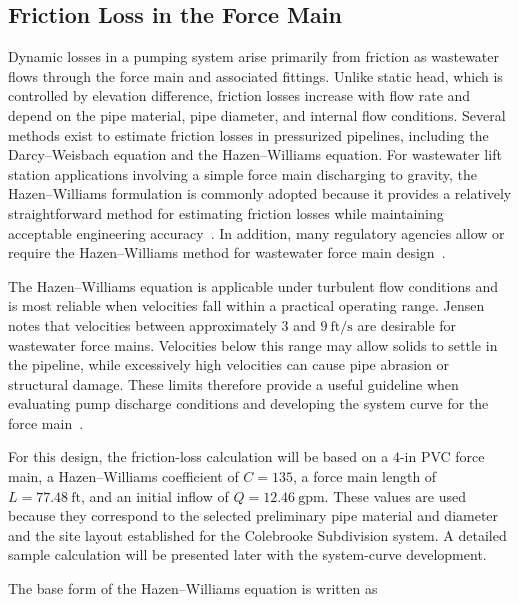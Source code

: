 \subsection{Friction Loss in the Force Main}

Dynamic losses in a pumping system arise primarily from friction as wastewater flows through the force main and associated fittings. Unlike static head, which is controlled by elevation difference, friction losses increase with flow rate and depend on the pipe material, pipe diameter, and internal flow conditions. Several methods exist to estimate friction losses in pressurized pipelines, including the Darcy--Weisbach equation and the Hazen--Williams equation. For wastewater lift station applications involving a simple force main discharging to gravity, the Hazen--Williams formulation is commonly adopted because it provides a relatively straightforward method for estimating friction losses while maintaining acceptable engineering accuracy~\cite{Jensen_PumpStationDesignGuidelines_2012}. In addition, many regulatory agencies allow or require the Hazen--Williams method for wastewater force main design~\cite{MDEQ_DesignGuidance_2025}.

The Hazen--Williams equation is applicable under turbulent flow conditions and is most reliable when velocities fall within a practical operating range. Jensen notes that velocities between approximately $3$ and $9~\text{ft/s}$ are desirable for wastewater force mains. Velocities below this range may allow solids to settle in the pipeline, while excessively high velocities can cause pipe abrasion or structural damage. These limits therefore provide a useful guideline when evaluating pump discharge conditions and developing the system curve for the force main~\cite{Jensen_PumpStationDesignGuidelines_2012}.

For this design, the friction-loss calculation will be based on a $4$-in PVC force main, a Hazen--Williams coefficient of $C = 135$, a force main length of $L = 77.48~\text{ft}$, and an initial inflow of $Q = 12.46~\text{gpm}$. These values are used because they correspond to the selected preliminary pipe material and diameter and the site layout established for the Colebrooke Subdivision system. A detailed sample calculation will be presented later with the system-curve development.

\pagebreak
The base form of the Hazen--Williams equation is written as

